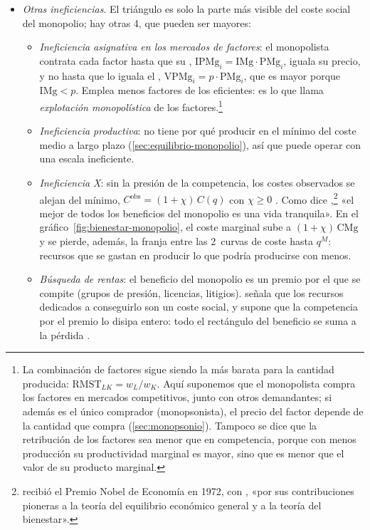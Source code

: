 \documentclass[11pt]{article}
\begin{document}
\begin{itemize}
\item \emph{Otras ineficiencias}. El triángulo es solo la parte más visible del coste social del monopolio; hay otras 4, que pueden ser mayores:
  \begin{itemize}
  \item \emph{Ineficiencia asignativa en los mercados de factores}: el monopolista contrata cada factor hasta que su , $\mathrm{IPMg}_i=\mathrm{IMg}\cdot\mathrm{PMg}_i$, iguala su precio, y no hasta que lo iguala el , $\mathrm{VPMg}_i=p\cdot\mathrm{PMg}_i$, que es mayor porque $\mathrm{IMg}<p$. Emplea menos factores de los eficientes: es lo que  llama \emph{explotación monopolística} de los factores.\footnote{La combinación de factores sigue siendo la más barata para la cantidad producida: $\mathrm{RMST}_{LK}=w_L/w_K$. Aquí suponemos que el monopolista compra los factores en mercados competitivos, junto con otros demandantes; si además es el único comprador (monopsonista), el precio del factor depende de la cantidad que compra (\ref{sec:monopsonio}). Tampoco se dice que la retribución de los factores sea menor que en competencia, porque con menos producción su productividad marginal es mayor, sino que es menor que el valor de su producto marginal.}
  \item \emph{Ineficiencia productiva}: no tiene por qué producir en el mínimo del coste medio a largo plazo (\ref{sec:equilibrio-monopolio}), así que puede operar con una escala ineficiente.
  \item \emph{Ineficiencia X}\nocite{Leibenstein1966Allocative}: sin la presión de la competencia, los costes observados se alejan del mínimo, $C^{\mathrm{obs}}=(1+\chi)\,C(q)$ con $\chi\geq 0$ . Como dice \textcite[8]{Hicks1935Annual},\footnote{ recibió el Premio Nobel de Economía en 1972, con , «por sus contribuciones pioneras a la teoría del equilibrio económico general y a la teoría del bienestar»\nocite{Nobel1972HicksArrow}.} «el mejor de todos los beneficios del monopolio es una vida tranquila». En el gráfico~\ref{fig:bienestar-monopolio}, el coste marginal sube a $(1+\chi)\,\mathrm{CMg}$ y se pierde, además, la franja entre las 2~curvas de coste hasta $q^M$: recursos que se gastan en producir lo que podría producirse con menos.
  \item \emph{Búsqueda de rentas}: el beneficio del monopolio es un premio por el que se compite (grupos de presión, licencias, litigios). \textcite{Tullock1967Welfare} señala que los recursos dedicados a conseguirlo son un coste social, y \textcite{Posner1975Social} supone que la competencia por el premio lo disipa entero: todo el rectángulo del beneficio se suma a la pérdida .
  \end{itemize}
\end{itemize}
\end{document}

